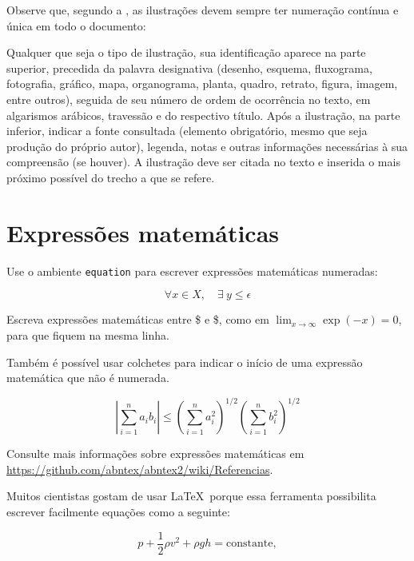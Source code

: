 Observe que, segundo a , as ilustrações devem sempre ter numeração contínua e única em todo o documento:

\begin{citacao}
Qualquer que seja o tipo de ilustração, sua identificação aparece na parte superior, precedida da palavra designativa (desenho, esquema, fluxograma, fotografia, gráfico, mapa, organograma, planta, quadro, retrato, figura, imagem, entre outros), seguida de seu número de ordem de ocorrência no texto, em algarismos arábicos, travessão e do respectivo título. Após a ilustração, na parte inferior, indicar a fonte consultada (elemento obrigatório, mesmo que seja produção do próprio autor), legenda, notas e outras informações necessárias à sua compreensão (se houver). A ilustração deve ser citada no texto e inserida o mais próximo possível do trecho a que se refere. \cite[seção 5.8]{NBR14724:2011}
\end{citacao}

\section{Expressões matemáticas}
\label{sec-mat}

Use o ambiente \texttt{equation} para escrever expressões matemáticas numeradas:

\begin{equation}
  \forall x \in X, \quad \exists \: y \leq \epsilon
\end{equation}

Escreva expressões matemáticas entre \$ e \$, como em $ \lim_{x \to \infty} \exp(-x) = 0 $, para que fiquem na mesma linha.

Também é possível usar colchetes para indicar o início de uma expressão matemática que não é numerada.

\[
\left|\sum_{i=1}^n a_ib_i\right|
\le
\left(\sum_{i=1}^n a_i^2\right)^{1/2}
\left(\sum_{i=1}^n b_i^2\right)^{1/2}
\]

Consulte mais informações sobre expressões matemáticas em \url{https://github.com/abntex/abntex2/wiki/Referencias}.

Muitos cientistas gostam de usar \LaTeX\ porque essa ferramenta possibilita escrever facilmente equações como a seguinte:

\begin{equation}
p+\frac{1}{2}{\rho}v^2+{\rho}gh = \text{constante},
 \label{eq:Bernoulli}
\end{equation}

